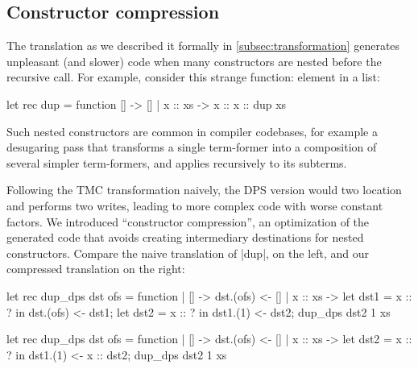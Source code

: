 \subsection{Constructor compression} \label{subsec:constructor-compression} The translation as we described it formally in \cref{subsec:transformation} generates unpleasant (and slower) code when many constructors are nested before the recursive call. For example, consider this strange function: element in a list:
\begin{Ocaml}
let rec dup = function [] -> [] | x :: xs -> x :: x :: dup xs
\end{Ocaml}

Such nested constructors are common in compiler codebases, for
example a desugaring pass that transforms a single term-former into
a composition of several simpler term-formers, and applies recursively to
its subterms.

Following the TMC transformation naively, the DPS version would two location and performs two writes, leading to more complex code with worse constant factors. We introduced ``constructor compression'', an optimization of the generated code that avoids creating intermediary destinations for nested constructors. Compare the naive translation of \ocaml|dup|, on the left, and our compressed translation on the right:

\begin{minipage}{0.5\linewidth}
\begin{Ocaml}
let rec dup_dps dst ofs = function
| [] -> dst.(ofs) <- []
| x :: xs ->
  let dst1 = x :: ? in
  dst.(ofs) <- dst1;
  let dst2 = x :: ? in
  dst1.(1) <- dst2;
  dup_dps dst2 1 xs
\end{Ocaml}
\end{minipage}
\hfill
\begin{minipage}{0.5\linewidth}
\begin{Ocaml}
let rec dup_dps dst ofs = function
| [] -> dst.(ofs) <- []
| x :: xs ->
  let dst2 = x :: ? in
  dst1.(1) <- x :: dst2;
  dup_dps dst2 1 xs
\end{Ocaml}
\end{minipage}

